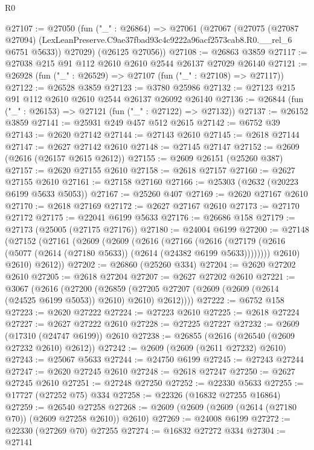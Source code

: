 \begin{lexlean}{R0}
\begin{coremodule}
@27107 := @27050
    (fun ("_" : @26864) =>
    @27061
      (@27067
        (@27075
          (@27087 @27094)
          (LexLeanPreserve.C9ae37fbad93c4c9222a96acf2573cab8.R0.__rel_6 @6751 @5633))
        @27029)
      (@26125 @27056))
@27108 := @26863 @3859
@27117 := @27038 @215 @91 @112 @2610 @2610 @2544 @26137 @27029 @26140
@27121 := @26928 (fun ("_" : @26529) => @27107 (fun ("_" : @27108) => @27117))
@27122 := @26528 @3859
@27123 := @3780 @25986
@27132 := @27123 @215 @91 @112 @2610 @2610 @2544 @26137 @26092 @26140
@27136 := @26844 (fun ("_" : @26153) => @27121 (fun ("_" : @27122) => @27132))
@27137 := @26152 @3859
@27141 := @25931 @249 @457 @512 @2615
@27142 := @6752 @39
@27143 := @2620 @27142
@27144 := @27143 @2610
@27145 := @2618 @27144
@27147 := @2627 @27142 @2610
@27148 := @27145 @27147
@27152 := @2609 (@2616 (@26157 @2615 @2612))
@27155 := @2609 @26151 (@25260 @387)
@27157 := @2620 @27155 @2610
@27158 := @2618 @27157
@27160 := @2627 @27155 @2610
@27161 := @27158 @27160
@27166 := @25303 (@2632 (@20223 @6199 @5633 @5053))
@27167 := @25260 @407
@27169 := @2620 @27167 @2610
@27170 := @2618 @27169
@27172 := @2627 @27167 @2610
@27173 := @27170 @27172
@27175 := @22041 @6199 @5633
@27176 := @26686 @158
@27179 := @27173 (@25005 (@27175 @27176))
@27180 := @24004 @6199
@27200 := @27148
    (@27152
      (@27161
        (@2609
          (@2609
            (@2616
              (@27166
                (@2616
                  (@27179 (@2616 (@5077 (@2614 (@27180 @5633)) (@2614 (@24382 @6199 @5633))))))))
            @2610)
          @2610)
        @2612))
@27202 := @26860 (@25260 @334)
@27204 := @2620 @27202 @2610
@27205 := @2618 @27204
@27207 := @2627 @27202 @2610
@27221 := @3067
    (@2616
      (@27200
        (@26859 (@27205 @27207 (@2609 (@2609 (@2614 (@24525 @6199 @5053)) @2610) @2610) @2612))))
@27222 := @6752 @158
@27223 := @2620 @27222
@27224 := @27223 @2610
@27225 := @2618 @27224
@27227 := @2627 @27222 @2610
@27228 := @27225 @27227
@27232 := @2609 (@17310 (@24747 @6199)) @2610
@27238 := @26855 (@2616 (@26540 (@2609 @27232 @2610) @2612))
@27242 := @2609 (@2609 (@2611 @27232) @2610)
@27243 := @25067 @5633
@27244 := @24750 @6199
@27245 := @27243 @27244
@27247 := @2620 @27245 @2610
@27248 := @2618 @27247
@27250 := @2627 @27245 @2610
@27251 := @27248 @27250
@27252 := @22330 @5633
@27255 := @17727 (@27252 @75) @334
@27258 := @22326 (@16832 @27255 @16864)
@27259 := @26540 @27258
@27268 := @2609 (@2609 (@2609 (@2614 (@27180 @70)) (@2609 @27258 @2610)) @2610)
@27269 := @24008 @6199
@27272 := @22330 (@27269 @70) @27255
@27274 := @16832 @27272 @334
@27304 := @27141

\end{coremodule}
\end{lexlean}
